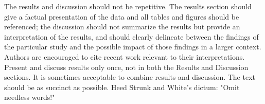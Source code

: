 The results and discussion should not be repetitive. The results section should give a factual 
presentation of the data and all tables and figures should be referenced; the discussion 
should not summarize the results but provide an interpretation of the results, and should 
clearly delineate between the findings of the particular study and the possible impact 
of those findings in a larger context. Authors are encouraged to cite recent work 
relevant to their interpretations. Present and discuss results only once, not in 
both the Results and Discussion sections. It is sometimes acceptable to combine 
results and discussion. The text should be as succinct as possible. 
Heed Strunk and White's dictum: "Omit needless words!"

\ifdefined\showtablesandfigures
\fi

\ifdefined\showtablesandfigures
\fi

\ifdefined\showtablesandfigures
\fi

\ifdefined\showtablesandfigures
\fi

